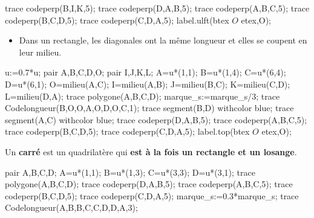 \begin{changemargin}{-5mm}{-15mm}
\begin{propriete}[\admise]
\begin{minipage}[t]{0.35\linewidth}
\begin{Geometrie}[CoinHD={(4.9u,3.5u)}]
                trace codeperp(B,I,K,5);
                trace codeperp(D,A,B,5);
                trace codeperp(A,B,C,5);
                trace codeperp(B,C,D,5);
                trace codeperp(C,D,A,5);
                label.ulft(btex $O$ etex,O);
            \end{Geometrie}
        \end{minipage}
        \hfill
        \begin{minipage}[t]{0.32\linewidth}
            \begin{itemize}
                \item Dans un rectangle, les diagonales ont la même longueur et elles se coupent en leur milieu.
            \end{itemize}
            \begin{Geometrie}[CoinHD={(4.9u,3.5u)}]
                u:=0.7*u;
                pair A,B,C,D,O;
                pair I,J,K,L;
                A=u*(1,1);
                B=u*(1,4);
                C=u*(6,4);
                D=u*(6,1);
                O=milieu(A,C);
                I=milieu(A,B);
                J=milieu(B,C);
                K=milieu(C,D);
                L=milieu(D,A);
                trace polygone(A,B,C,D);
                marque_s:=marque_s/3;
                trace Codelongueur(B,O,O,A,O,D,O,C,1);
                trace segment(B,D) withcolor blue;
                trace segment(A,C) withcolor blue;
                trace codeperp(D,A,B,5);
                trace codeperp(A,B,C,5);
                trace codeperp(B,C,D,5);
                trace codeperp(C,D,A,5);
                label.top(btex $O$ etex,O);
            \end{Geometrie}
        \end{minipage}
    \end{propriete}
    
    \begin{definition}        
        \begin{minipage}{0.7\linewidth}
            Un \textbf{carré} est un quadrilatère qui \textbf{est à la fois un rectangle et un losange}.
        \end{minipage}
        \hfill
        \begin{minipage}{0.3\linewidth}
            \begin{center}
                \begin{Geometrie}
                    pair A,B,C,D;
                    A=u*(1,1);
                    B=u*(1,3);
                    C=u*(3,3);
                    D=u*(3,1);
                    trace polygone(A,B,C,D);
                    trace codeperp(D,A,B,5);
                    trace codeperp(A,B,C,5);
                    trace codeperp(B,C,D,5);
                    trace codeperp(C,D,A,5);
                    marque_s:=0.3*marque_s;
                    trace Codelongueur(A,B,B,C,C,D,D,A,3);
                \end{Geometrie} 
            \end{center}
        \end{minipage}
    \end{definition}


\end{changemargin}
